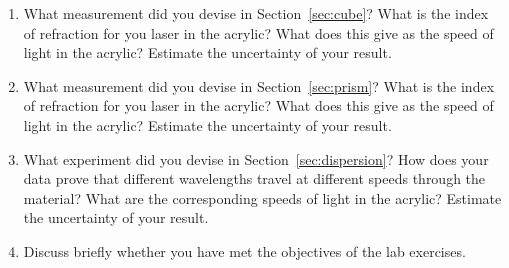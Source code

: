 \documentclass[12pt]{article}
\begin{document}
\begin{enumerate}
\item What measurement did you devise in Section~\ref{sec:cube}?  What
  is the index of refraction for you laser in the acrylic?  What does
  this give as the speed of light in the acrylic?  Estimate the
  uncertainty of your result.
\item What measurement did you devise in Section~\ref{sec:prism}?
  What is the index of refraction for you laser in the acrylic?  What
  does this give as the speed of light in the acrylic?  Estimate the
  uncertainty of your result.
\item What experiment did you devise in Section~\ref{sec:dispersion}?
  How does your data prove that different wavelengths travel at
  different speeds through the material?  What are the corresponding
  speeds of light in the acrylic?  Estimate the uncertainty of your
  result.
\item Discuss briefly whether you have met the objectives of the lab
  exercises.
\end{enumerate}
\end{document}
